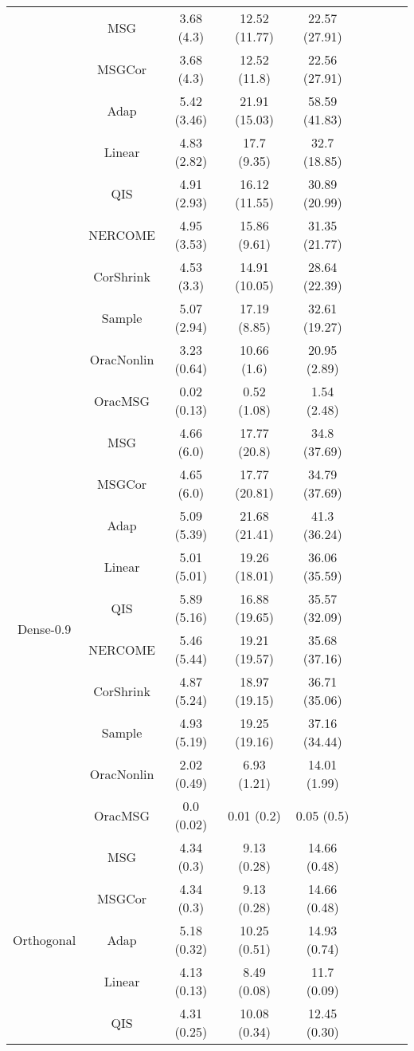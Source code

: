 \documentclass{article}
\begin{document}
\begin{table}[H]
{\begin{tabular}{ccccccccc}
 & MSG & 3.68 (4.3)  & 12.52 (11.77) & 22.57 (27.91) \\
 & MSGCor   & 3.68 (4.3)  & 12.52 (11.8)  & 22.56 (27.91) \\
 & Adap     & 5.42 (3.46) & 21.91 (15.03) & 58.59 (41.83) \\
 & Linear         & 4.83 (2.82) & 17.7 (9.35)   & 32.7 (18.85)  \\
 & QIS            & 4.91 (2.93) & 16.12 (11.55)  & 30.89 (20.99) \\
 & NERCOME        & 4.95 (3.53) & 15.86 (9.61)  & 31.35 (21.77) \\
 & CorShrink      & 4.53 (3.3)  & 14.91 (10.05) & 28.64 (22.39) \\
 & Sample            & 5.07 (2.94) & 17.19 (8.85)  & 32.61 (19.27) \\
 & OracNonlin & 3.23 (0.64) & 10.66 (1.6)   & 20.95 (2.89)  \\
 & OracMSG  & 0.02 (0.13) & 0.52 (1.08)   & 1.54 (2.48)  \\ \midrule
\multirow{10}{*}{Dense-0.9}  
 & MSG & 4.66 (6.0)  & 17.77 (20.8)  & 34.8 (37.69)  \\
 & MSGCor   & 4.65 (6.0)  & 17.77 (20.81) & 34.79 (37.69) \\
 & Adap     & 5.09 (5.39) & 21.68 (21.41) & 41.3 (36.24)  \\
 & Linear         & 5.01 (5.01) & 19.26 (18.01) & 36.06 (35.59) \\
 & QIS            & 5.89 (5.16)  & 16.88 (19.65)  & 35.57 (32.09) \\
 & NERCOME        & 5.46 (5.44) & 19.21 (19.57) & 35.68 (37.16) \\
 & CorShrink      & 4.87 (5.24) & 18.97 (19.15) & 36.71 (35.06) \\
 & Sample            & 4.93 (5.19) & 19.25 (19.16) & 37.16 (34.44) \\
 & OracNonlin & 2.02 (0.49) & 6.93 (1.21)   & 14.01 (1.99)  \\
 & OracMSG  & 0.0 (0.02)  & 0.01 (0.2)    & 0.05 (0.5) \\ \midrule
\multirow{10}{*}{Orthogonal}  
 & MSG & 4.34 (0.3)  & 9.13 (0.28)  & 14.66 (0.48) \\
 & MSGCor   & 4.34 (0.3)  & 9.13 (0.28)  & 14.66 (0.48) \\
 & Adap     & 5.18 (0.32) & 10.25 (0.51) & 14.93 (0.74) \\
 & Linear         & 4.13 (0.13) & 8.49 (0.08)  & 11.7 (0.09)  \\
 & QIS            & 4.31 (0.25) & 10.08 (0.34)  & 12.45 (0.30) \\

\end{tabular}}
\end{table}
\end{document}
